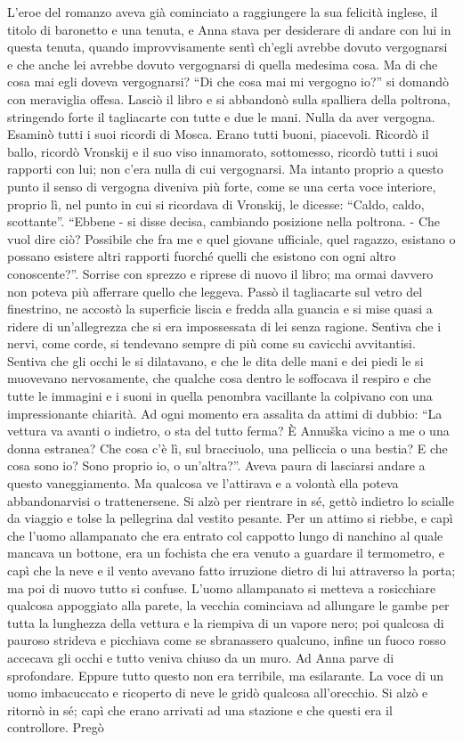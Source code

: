 L'eroe del romanzo aveva già cominciato a raggiungere la sua felicità inglese, il titolo di baronetto e una tenuta, e Anna stava per desiderare di andare con lui in questa tenuta, quando improvvisamente sentì ch'egli avrebbe dovuto vergognarsi e che anche lei avrebbe dovuto vergognarsi di quella medesima cosa. Ma di che cosa mai egli doveva vergognarsi? ``Di che cosa mai mi vergogno io?'' si domandò con meraviglia offesa. Lasciò il libro e si abbandonò sulla spalliera della poltrona, stringendo forte il tagliacarte con tutte e due le mani. Nulla da aver vergogna. Esaminò tutti i suoi ricordi di Mosca. Erano tutti buoni, piacevoli. Ricordò il ballo, ricordò Vronskij e il suo viso innamorato, sottomesso, ricordò tutti i suoi rapporti con lui; non c'era nulla di cui vergognarsi. Ma intanto proprio a questo punto il senso di vergogna diveniva più forte, come se una certa voce interiore, proprio lì, nel punto in cui si ricordava di Vronskij, le dicesse: ``Caldo, caldo, scottante''. ``Ebbene - si disse decisa, cambiando posizione nella poltrona. - Che vuol dire ciò? Possibile che fra me e quel giovane ufficiale, quel ragazzo, esistano o possano esistere altri rapporti fuorché quelli che esistono con ogni altro conoscente?''. Sorrise con sprezzo e riprese di nuovo il libro; ma ormai davvero non poteva più afferrare quello che leggeva. Passò il tagliacarte sul vetro del finestrino, ne accostò la superficie liscia e fredda alla guancia e si mise quasi a ridere di un'allegrezza che si era impossessata di lei senza ragione. Sentiva che i nervi, come corde, si tendevano sempre di più come su cavicchi avvitantisi. Sentiva che gli occhi le si dilatavano, e che le dita delle mani e dei piedi le si muovevano nervosamente, che qualche cosa dentro le soffocava il respiro e che tutte le immagini e i suoni in quella penombra vacillante la colpivano con una impressionante chiarità. Ad ogni momento era assalita da attimi di dubbio: ``La vettura va avanti o indietro, o sta del tutto ferma? È Annuška vicino a me o una donna estranea? Che cosa c'è lì, sul bracciuolo, una pelliccia o una bestia? E che cosa sono io? Sono proprio io, o un'altra?''. Aveva paura di lasciarsi andare a questo vaneggiamento. Ma qualcosa ve l'attirava e a volontà ella poteva abbandonarvisi o trattenersene. Si alzò per rientrare in sé, gettò indietro lo scialle da viaggio e tolse la pellegrina dal vestito pesante. Per un attimo si riebbe, e capì che l'uomo allampanato che era entrato col cappotto lungo di nanchino al quale mancava un bottone, era un fochista che era venuto a guardare il termometro, e capì che la neve e il vento avevano fatto irruzione dietro di lui attraverso la porta; ma poi di nuovo tutto si confuse. L'uomo allampanato si metteva a rosicchiare qualcosa appoggiato alla parete, la vecchia cominciava ad allungare le gambe per tutta la lunghezza della vettura e la riempiva di un vapore nero; poi qualcosa di pauroso strideva e picchiava come se sbranassero qualcuno, infine un fuoco rosso accecava gli occhi e tutto veniva chiuso da un muro. Ad Anna parve di sprofondare. Eppure tutto questo non era terribile, ma esilarante. La voce di un uomo imbacuccato e ricoperto di neve le gridò qualcosa all'orecchio. Si alzò e ritornò in sé; capì che erano arrivati ad una stazione e che questi era il controllore. Pregò 